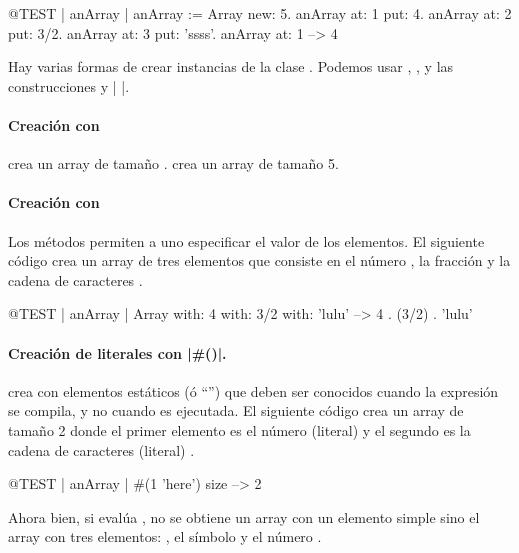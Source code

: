 \documentclass[a4paper,10pt,twoside]{book}
\begin{document}
\begin{code}{@TEST | anArray | }
anArray := Array new: 5.
anArray at: 1 put: 4.
anArray at: 2 put: 3/2.
anArray at: 3 put: 'ssss'.
anArray at: 1 --> 4
\end{code}

Hay varias formas de crear instancias de la clase . Podemos usar , , y las construcciones \ct{#( )} y \ct|{ }|.

\paragraph{Creaci\'on con }  crea un array de tama\~{n}o .
 crea un array de tama\~{n}o 5.

\paragraph{Creaci\'on con } Los m\'etodos  permiten a uno especificar el valor de los elementos.  
El siguiente c\'odigo crea un array de tres elementos que consiste en el n\'umero , la fracci\'on  y la cadena de caracteres .

\begin{code}{@TEST | anArray |}
Array with: 4 with: 3/2 with: 'lulu' -->  {4 . (3/2) . 'lulu'}
\end{code}

\paragraph{Creaci\'on de literales con \ct|\#()|.}
\ct{#()} crea  con elementos est\'aticos (\'o ``'') que deben ser conocidos cuando la expresi\'on se compila, y no cuando es ejecutada. El siguiente c\'odigo crea un array de tama\~{n}o 2 donde el primer elemento es el n\'umero (literal)  y el segundo es la cadena de caracteres (literal) .


\begin{code}{@TEST | anArray |}
#(1 'here') size --> 2
\end{code}

Ahora bien, si eval\'ua , no se obtiene un array con un elemento simple  sino el array  \ie con tres elementos: , el s\'imbolo \ct{#+} y el n\'umero .
\end{document}
